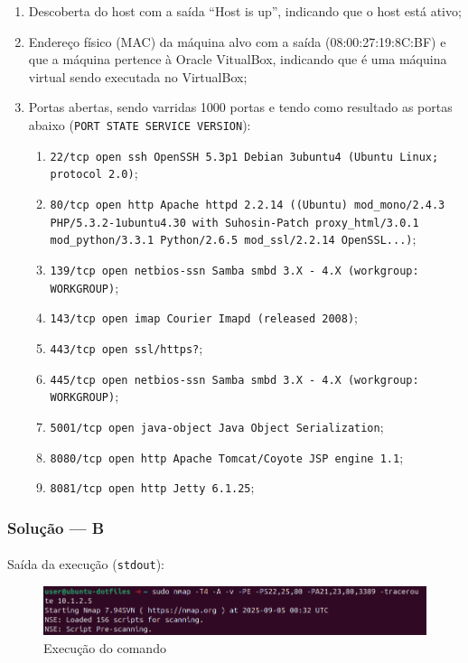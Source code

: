 \documentclass[12pt]{article}
\begin{document}
\begin{enumerate}
  \item Descoberta do host com a saída “Host is up”, indicando que o host está ativo;
  \item Endereço físico (MAC) da máquina alvo com a saída (08:00:27:19:8C:BF) e que a máquina pertence à Oracle VitualBox, indicando que é uma máquina virtual sendo executada no VirtualBox;
  \item Portas abertas, sendo varridas 1000 portas e tendo como resultado as portas abaixo (\texttt{PORT     STATE SERVICE     VERSION}):
  \begin{enumerate}
    \item \texttt{22/tcp   open  ssh         OpenSSH 5.3p1 Debian 3ubuntu4 (Ubuntu Linux; protocol 2.0)};
    \item \texttt{80/tcp   open  http        Apache httpd 2.2.14 ((Ubuntu) mod\_mono/2.4.3 PHP/5.3.2-1ubuntu4.30 with Suhosin-Patch proxy\_html/3.0.1 mod\_python/3.3.1 Python/2.6.5 mod\_ssl/2.2.14 OpenSSL...)};
    \item \texttt{139/tcp  open  netbios-ssn Samba smbd 3.X - 4.X (workgroup: WORKGROUP)};
    \item \texttt{143/tcp  open  imap        Courier Imapd (released 2008)};
    \item \texttt{443/tcp  open  ssl/https?};
    \item \texttt{445/tcp  open  netbios-ssn Samba smbd 3.X - 4.X (workgroup: WORKGROUP)};
    \item \texttt{5001/tcp open  java-object Java Object Serialization};
    \item \texttt{8080/tcp open  http        Apache Tomcat/Coyote JSP engine 1.1};
    \item \texttt{8081/tcp open  http        Jetty 6.1.25};
  \end{enumerate}
\end{enumerate}

\subsubsection{Solução --- \textbf{B}}

\paragraph{}Saída da execução (\texttt{stdout}):

\begin{figure}[h!]
\centerline{\includegraphics[totalheight=1.5cm]{nmap-2.png}}
  \caption{Execução do comando}
  \label{fig:nmap1}
\end{figure}
\end{document}
